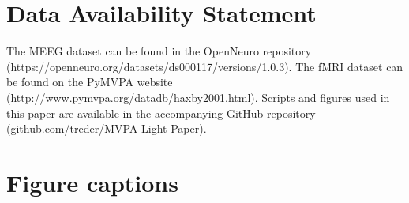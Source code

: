 \documentclass[utf8]{frontiersSCNS} %
\begin{document}
\section*{Data Availability Statement}
The MEEG dataset can be found in the OpenNeuro repository (https://openneuro.org/datasets/ds000117/versions/1.0.3). The fMRI dataset can be found on the PyMVPA website (http://www.pymvpa.org/datadb/haxby2001.html). Scripts and figures used in this paper are available in the accompanying GitHub repository (github.com/treder/MVPA-Light-Paper).




\section*{Figure captions}


\end{document}
